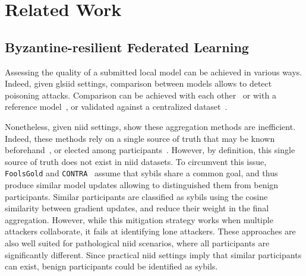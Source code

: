 \section{Related Work}\label{sec:related}

\subsection{Byzantine-resilient Federated Learning}\label{sec:countermeasures}
Assessing the quality of a submitted local model can be achieved in various ways.
Indeed, given gls{iid} settings, comparison between models allows to detect poisoning attacks. 
Comparison can be achieved with each other~\cite{blanchard_machine_2017,cao_fltrust_2022} or with a reference model~\cite{xia_tofi_2021, zhou_differentially_2022}, or validated against a centralized dataset~\cite{cao_fltrust_2022}. 

Nonetheless, given \gls{niid} settings, \citet{you_poisoning_2022} show these aggregation methods are inefficient.   
Indeed, these methods rely on a single source of truth that may be known beforehand~\cite{cao_fltrust_2022}, or elected among participants~\cite{blanchard_machine_2017}.
However, by definition, this single source of truth does not exist in \gls{niid} datasets. 
To circumvent this issue, \texttt{FoolsGold} and \texttt{CONTRA}~\cite{fung_limitations_2020,awan_contra_2021} assume that sybils share a common goal, and thus produce similar model updates allowing to distinguished them from benign participants.
Similar participants are classified as sybils using the cosine similarity between gradient updates, and reduce their weight in the final aggregation. 
However, while this mitigation strategy works when multiple attackers collaborate, it fails at identifying lone attackers.
These approaches are also well suited for pathological \gls{niid} scenarios, where all participants are significantly different.
Since practical \gls{niid} settings imply that similar participants can exist, benign participants could be identified as sybils.


